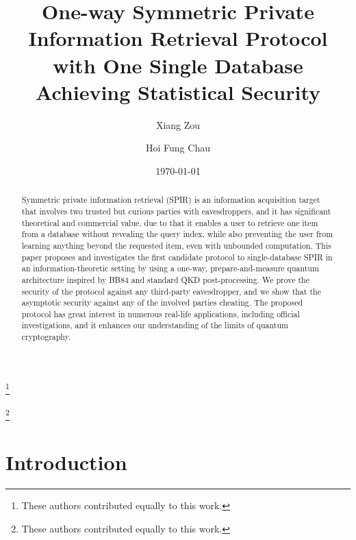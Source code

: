 \documentclass[%
 reprint,
superscriptaddress,
 amsmath,amssymb,
 aps,
]{revtex4-2}
\begin{document}

\title{One-way Symmetric Private Information Retrieval Protocol with One Single Database Achieving Statistical Security}%

\author{Xiang Zou}
\thanks{These authors contributed equally to this work.}

\author{Hoi Fung Chau}
\thanks{These authors contributed equally to this work.}
%

\date{\today}

\begin{abstract}
Symmetric private information retrieval (SPIR) is an information acquisition target that involves two trusted but curious parties with eavesdroppers, and it has significant theoretical and commercial value, due to that it enables a user to retrieve one item from a database without revealing the query index, while also preventing the user from learning anything beyond the requested item, even with unbounded computation. This paper proposes and investigates the first candidate protocol to single-database SPIR in an information-theoretic setting by using a one-way, prepare-and-measure quantum architecture inspired by BB84 and standard QKD post-processing. We prove the security of the protocol against any third-party eavesdropper, and we show that the asymptotic security against any of the involved parties cheating. The proposed protocol has great interest in numerous real-life applications, including official investigations, and it enhances our understanding of the limits of quantum cryptography.
\end{abstract}


\maketitle


\section{Introduction}
\end{document}
